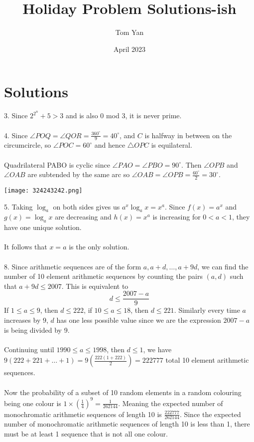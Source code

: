 \documentclass{article}
\title{Holiday Problem Solutions-ish}
\author{Tom Yan}
\date{April 2023}
\begin{document}
\maketitle

\section*{Solutions}
3. Since $2^{2^n}+5>3$ and is also 0 mod 3, it is never prime.  \\\\
4. Since $\angle POQ = \angle QOR = \frac{360^{\circ}}{9}=40^{\circ}$, and $C$ is halfway in between on the circumcircle, so $\angle POC = 60^{\circ}$ and hence $\triangle OPC$ is equilateral. \\\\ Quadrilateral PABO is cyclic since $\angle PAO = \angle PBO = 90^{\circ}$. Then $\angle OPB$ and $\angle OAB$ are subtended by the same arc so $\angle OAB = \angle OPB = \frac{60^{\circ}}{2} = 30^{\circ}$. 
\\

\centerline{\texttt{[image: 324243242.png]}} 
5. Taking $\log_a$ on both sides gives us $a^x\log_a{x}=x^a$. Since $f(x)=a^x$ and $g(x)=\log_a{x}$ are decreasing and $h(x)=x^a$ is increasing for $0<a<1$, they have one unique solution. \\\\ It follows that $x=a$ is the only solution.  \\\\
8. Since arithmetic sequences are of the form $a, a+d, \ldots, a+9d$, we can find the number of 10 element arithmetic sequences by counting the pairs $(a,d)$ such that $a+9d \le 2007$. This is equivalent to $$d \le \frac{2007-a}{9}$$ If $1 \le a \le 9$, then $d \le 222$, if $10 \le a \le 18$, then $d \le 221$. Similarly every time $a$ increases by $9$, $d$ has one less possible value since we are the expression $2007-a$ is being divided by 9. \\\\ Continuing until $1990\le a\le 1998$, then $d\le 1$, we have $9(222+221+\ldots+1) = 9(\frac{222(1+222)}{2})=222777$ total 10 element arithmetic sequences. \\\\ Now the probability of a subset of 10 random elements in a random colouring being one colour is $1 \times (\frac{1}{4})^9 = \frac{1}{262144}$. Meaning the expected number of monochromatic arithmetic sequences of length 10 is $\frac{222777}{262144}$. Since the expected number of monochromatic arithmetic sequences of length 10 is less than 1, there must be at least 1 sequence that is not all one colour. \\\\
\end{document}
